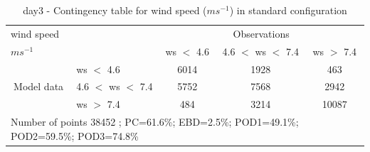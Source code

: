 \begin{table}[h!]
\begin{center}
\begin{tabular}{llccc}
\hline
{wind speed}                                       &                                                    & \multicolumn{3}{c}{Observations}                 \\
{$m s^{-1}$}                                       &                             & ws $<$ 4.6   & 4.6 $<$ ws $<$ 7.4 & ws $>$ 7.4 \\
\hline
\multicolumn{1}{c}{\multirow{3}{*}{Model data}}  & ws $<$ 4.6             & 6014                & 1928                       & 463              \\
                                                 & 4.6  $<$ ws $<$ 7.4 & 5752                & 7568                       & 2942              \\
                                                 & ws $>$ 7.4             & 484                & 3214                       & 10087              \\
\hline 
\multicolumn{5}{l}{ Number of points        38452 ; PC=61.6\%; EBD=2.5\%; POD1=49.1\%; POD2=59.5\%; POD3=74.8\%}                 \\
\end{tabular}
\end{center}
\caption{day3 - Contingency table for {wind speed} ($m s^{-1}$) in standard configuration}
\label{tab:contingencywsBEF:day3}
\end{table}

